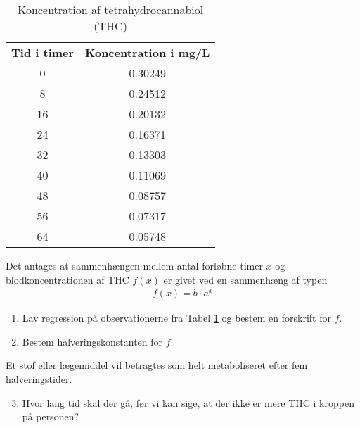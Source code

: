 \begin{table}[H]
	\centering
	\begin{tabular}{cc}
		\textbf{Tid i timer} & \textbf{Koncentration i mg/L} \\

		0 & 0.30249 \\

		8 & 0.24512 \\
 
		16 &  0.20132 \\

		24 & 0.16371 \\

		32 & 0.13303\\

		40 & 0.11069\\

		48 & 0.08757\\
		56 & 0.07317\\

		64 & 0.05748
	\end{tabular}
	\caption{Koncentration af tetrahydrocannabiol (THC)}
	\label{tab:cannabis}
\end{table}

Det antages at sammenhængen mellem antal forløbne timer $x$ og blodkoncentrationen af THC $f(x)$ er givet ved en sammenhæng af typen
\begin{align*}
	f(x) = b \cdot a^x
\end{align*}
\begin{enumerate}[label=\roman*)]
	\item Lav regression på observationerne fra Tabel \ref{tab:cannabis} og bestem en forskrift for $f$.
	\item Bestem halveringskonstanten for $f$.
\end{enumerate}
Et stof eller lægemiddel vil betragtes som helt metaboliseret efter fem halveringstider.

\begin{enumerate}[label=\roman*)]
	\setcounter{enumi}{2}
	\item Hvor lang tid skal der gå, før vi kan sige, at der ikke er mere THC i kroppen på personen?
\end{enumerate}
